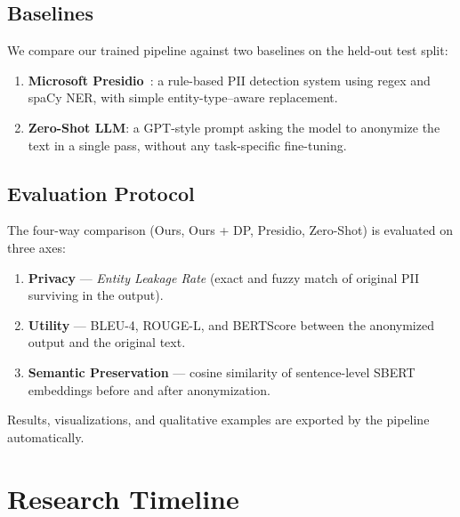 \documentclass[11pt, a4paper]{article}
\begin{document}
\subsection{Baselines}

We compare our trained pipeline against two baselines on the held-out test split:
\begin{enumerate}
  \item \textbf{Microsoft Presidio}~\cite{presidio2023}: a rule-based PII
        detection system using regex and spaCy NER, with simple
        entity-type--aware replacement.
  \item \textbf{Zero-Shot LLM}: a GPT-style prompt asking the model
        to anonymize the text in a single pass, without any task-specific
        fine-tuning.
\end{enumerate}

\subsection{Evaluation Protocol}

The four-way comparison (Ours, Ours + DP, Presidio, Zero-Shot) is
evaluated on three axes:
\begin{enumerate}
  \item \textbf{Privacy} --- \emph{Entity Leakage Rate} (exact and
        fuzzy match of original PII surviving in the output).
  \item \textbf{Utility} --- BLEU-4, ROUGE-L, and BERTScore between
        the anonymized output and the original text.
  \item \textbf{Semantic Preservation} --- cosine similarity of
        sentence-level SBERT embeddings before and after anonymization.
\end{enumerate}
Results, visualizations, and qualitative examples are exported by the
pipeline automatically.


\section{Research Timeline}
\end{document}
